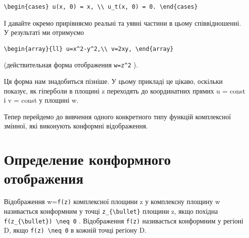 \documentclass[
  ukrainian,
]{article}
\begin{document}
\begin{verbatim}
\begin{cases} u(x, 0) = x, \\ u_t(x, 0) = 0. \end{cases}
\end{verbatim}

І давайте окремо прирівняємо реальні та уявні частини в цьому
співвідношенні. У результаті ми отримуємо

\begin{verbatim}
\begin{array}{ll} u=x^2-y^2,\\ v=2xy, \end{array}
\end{verbatim}

(действительная форма отображения \texttt{w=z\^{}2} ).

Ця форма нам знадобиться пізніше. У цьому прикладі це цікаво, оскільки
показує, як гіперболи в площині z переходять до координатних прямих u =
const і v = const у площині w.

Тепер перейдемо до вивчення одного конкретного типу функцій комплексної
змінної, які виконують конформні відображення.

\section{Определение конформного
отображения}\label{ux43eux43fux440ux435ux434ux435ux43bux435ux43dux438ux435-ux43aux43eux43dux444ux43eux440ux43cux43dux43eux433ux43e-ux43eux442ux43eux431ux440ux430ux436ux435ux43dux438ux44f}

Відображення w=\texttt{f(z)} комплексної площини z у комплексну площину
w називається конформним у точці \texttt{z\_\{\textbackslash{}bullet\}}
площини z, якщо похідна
\texttt{f\textquotesingle{}(z\_\{\textbackslash{}bullet\})\ \textbackslash{}neq\ 0}
. Відображення \texttt{f(z)} називається конформним у регіоні D, якщо
\texttt{f\textquotesingle{}(z)\ \textbackslash{}neq\ 0} в кожній точці
регіону D.
\end{document}
